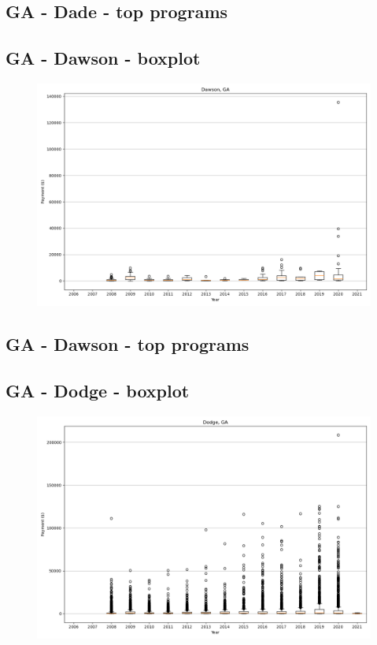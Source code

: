 \subsection*{GA - Dade - top programs}

\newpage
\subsection*{GA - Dawson - boxplot}
\begin{figure}[h]
\centering
\includegraphics[width=7in]{../output/boxplots/counties/Dawson-GA_boxplot.png}
\end{figure}


\subsection*{GA - Dawson - top programs}

\newpage
\subsection*{GA - Dodge - boxplot}
\begin{figure}[h]
\centering
\includegraphics[width=7in]{../output/boxplots/counties/Dodge-GA_boxplot.png}
\end{figure}


